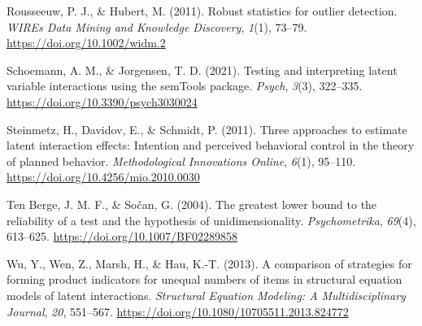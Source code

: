 \documentclass[
  man]{apa6}
\newlength{\cslhangindent}
\newenvironment{CSLReferences}[2] %
 {\begin{list}{}{%
  \setlength{\itemindent}{0pt}
  \setlength{\leftmargin}{0pt}
  \setlength{\parsep}{0pt}
  \ifodd #1
   \setlength{\leftmargin}{\cslhangindent}
   \setlength{\itemindent}{-1\cslhangindent}
  \fi
  \setlength{\itemsep}{#2\baselineskip}}}
 {\end{list}}
\begin{document}
\begin{CSLReferences}{1}{0}
Rousseeuw, P. J., \& Hubert, M. (2011). Robust statistics for outlier detection. \emph{WIREs Data Mining and Knowledge Discovery}, \emph{1}(1), 73--79. \url{https://doi.org/10.1002/widm.2}

Schoemann, A. M., \& Jorgensen, T. D. (2021). Testing and interpreting latent variable interactions using the {semTools} package. \emph{Psych}, \emph{3}(3), 322--335. \url{https://doi.org/10.3390/psych3030024}

Steinmetz, H., Davidov, E., \& Schmidt, P. (2011). Three approaches to estimate latent interaction effects: {Intention} and perceived behavioral control in the theory of planned behavior. \emph{Methodological Innovations Online}, \emph{6}(1), 95--110. \url{https://doi.org/10.4256/mio.2010.0030}

Ten Berge, J. M. F., \& Sočan, G. (2004). The greatest lower bound to the reliability of a test and the hypothesis of unidimensionality. \emph{Psychometrika}, \emph{69}(4), 613--625. \url{https://doi.org/10.1007/BF02289858}

Wu, Y., Wen, Z., Marsh, H., \& Hau, K.-T. (2013). A comparison of strategies for forming product indicators for unequal numbers of items in structural equation models of latent interactions. \emph{Structural Equation Modeling: A Multidisciplinary Journal}, \emph{20}, 551--567. \url{https://doi.org/10.1080/10705511.2013.824772}

\end{CSLReferences}
\end{document}
